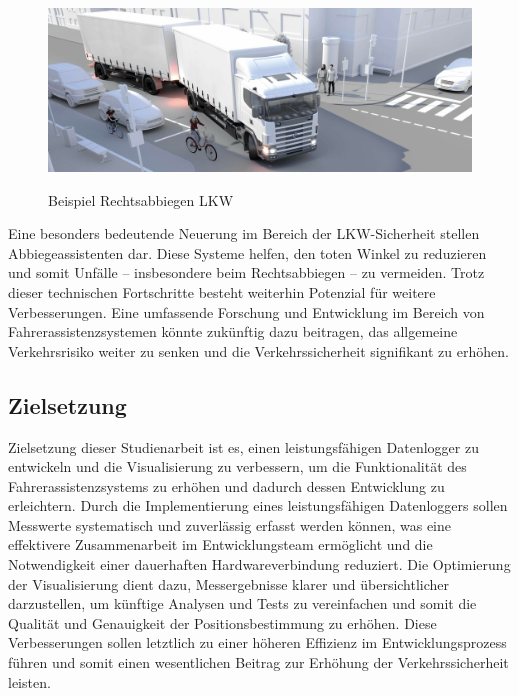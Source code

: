 \documentclass[a4paper, 12pt]{article} %
\begin{document}
\begin{figure}[H]
    \includegraphics[width=1\linewidth]{images/abbiegeassistent-scaled-7b2478b8}\\[1ex]
    \centering
    \caption{Beispiel Rechtsabbiegen LKW}
    \label{ABBILDUNG}
\end{figure}


Eine besonders bedeutende Neuerung im Bereich der \acf{LKW}-Sicherheit stellen Abbiegeassistenten dar. 
Diese Systeme helfen, den toten Winkel zu reduzieren und somit Unfälle – insbesondere beim Rechtsabbiegen – zu vermeiden. 
Trotz dieser technischen Fortschritte besteht weiterhin Potenzial für weitere Verbesserungen. Eine umfassende Forschung und Entwicklung 
im Bereich von Fahrerassistenzsystemen könnte zukünftig dazu beitragen, das allgemeine Verkehrsrisiko weiter zu senken und die Verkehrssicherheit
signifikant zu erhöhen. \cite{SlightIncreaseNumber}

\clearpage

\subsection{Zielsetzung}
Zielsetzung dieser Studienarbeit ist es, einen 
leistungsfähigen Datenlogger zu entwickeln und die Visualisierung 
zu verbessern, um die Funktionalität des Fahrerassistenzsystems zu erhöhen 
und dadurch dessen Entwicklung zu erleichtern. Durch die Implementierung eines 
leistungsfähigen Datenloggers sollen Messwerte systematisch und zuverlässig 
erfasst werden können, was eine effektivere Zusammenarbeit im Entwicklungsteam 
ermöglicht und die Notwendigkeit einer dauerhaften Hardwareverbindung reduziert. Die Optimierung der Visualisierung 
dient dazu, Messergebnisse klarer und übersichtlicher darzustellen, um künftige Analysen und Tests zu vereinfachen und somit
 die Qualität und Genauigkeit der Positionsbestimmung zu erhöhen. Diese Verbesserungen sollen letztlich zu einer höheren Effizienz
  im Entwicklungsprozess führen und 
somit einen wesentlichen Beitrag zur Erhöhung der Verkehrssicherheit leisten.
\end{document}
